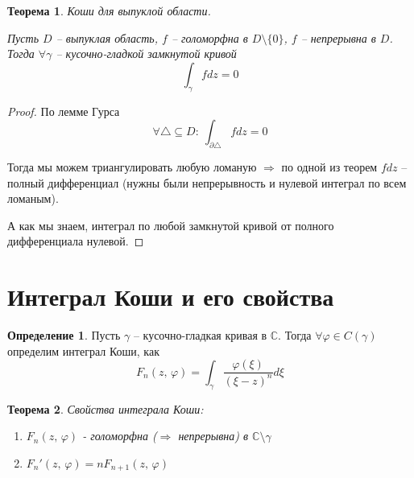 \documentclass[a4paper,12pt]{article}
\renewcommand{\phi}{\ensuremath{\varphi}}
\theoremstyle{plain}
\newtheorem{theorem}{Теорема}[section]
\theoremstyle{definition}
\newtheorem{definition}{Определение}[section]
\theoremstyle{remark}
\begin{document}
\begin{theorem}
	Коши для выпуклой области.

	Пусть $D$ -- выпуклая область, $f$ -- голоморфна в $D \setminus \{0\}$, $f$ -- непрерывна в $D$. Тогда $\forall \gamma$ -- кусочно-гладкой замкнутой кривой
	\[
		\int_\gamma fdz = 0
	\]
\end{theorem}

\begin{proof}
	По лемме Гурса
	\[
		\forall \triangle \subseteq D :\: \int_{\partial \triangle} fdz = 0
	\]

	Тогда мы можем триангулировать любую ломаную $\Rightarrow$ по одной из теорем $fdz$ -- полный дифференциал (нужны были непрерывность и нулевой интеграл по всем ломаным).

	А как мы знаем, интеграл по любой замкнутой кривой от полного дифференциала нулевой.
\end{proof}

\section{Интеграл Коши и его свойства}
\begin{definition}
	Пусть $\gamma$ -- кусочно-гладкая кривая в $\mathbb{C}$. Тогда $\forall \phi \in C(\gamma)$ определим интеграл Коши, как
	\[
		F_n(z,\, \phi) = \int_\gamma \frac{\phi(\xi)}{(\xi - z)^n}d\xi
	\]
\end{definition}

\begin{theorem}
	Свойства интеграла Коши:
	\begin{enumerate}
		\item $F_n(z,\, \phi)$ - голоморфна ($\Rightarrow$ непрерывна) в $\mathbb{C} \setminus \gamma$
		\item $F_n'(z,\, \phi) = nF_{n + 1}(z,\, \phi)$
	\end{enumerate}
\end{theorem}
\end{document}
